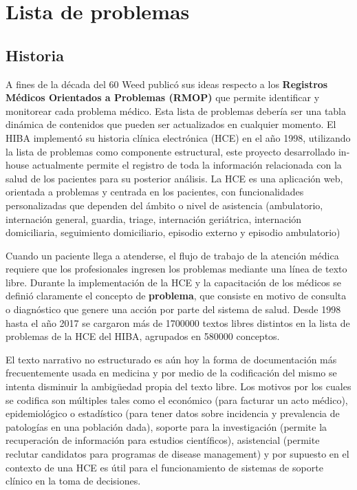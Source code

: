 \section{Lista de problemas}
\subsection{Historia}
A fines de la década del 60 Weed\cite{Weed1968} publicó sus ideas respecto a los \textbf{Registros Médicos Orientados a Problemas (RMOP)} que permite identificar y monitorear cada problema médico. Esta lista de problemas debería ser una tabla dinámica de contenidos que pueden ser actualizados en cualquier momento. El HIBA implementó su historia clínica electrónica (HCE) en el año 1998, utilizando la lista de problemas como componente estructural, este proyecto desarrollado in-house actualmente permite el registro de toda la información relacionada con la salud de los pacientes para su posterior análisis\cite{Luna2013,luna2003implementacion}. La HCE es una aplicación web, orientada a problemas y centrada en los pacientes, con funcionalidades personalizadas que dependen del ámbito o nivel de asistencia (ambulatorio, internación general, guardia, triage, internación geriátrica, internación domiciliaria, seguimiento domiciliario, episodio externo y episodio ambulatorio)
 
Cuando un paciente llega a atenderse, el flujo de trabajo de la atención médica requiere que los profesionales ingresen los problemas mediante una línea de texto libre. Durante la implementación de la HCE y la capacitación de los médicos se definió claramente el concepto de \textbf{problema}, que consiste en motivo de consulta o diagnóstico que
genere una acción por parte del sistema de salud\cite{lopez2004codificacion}. Desde 1998 hasta el año 2017 se cargaron más de \num{1700000} textos libres distintos en la lista de problemas de la HCE del HIBA, agrupados en \num{580000} conceptos.

El texto narrativo no estructurado es aún hoy la forma de documentación más frecuentemente usada en medicina y por medio de la codificación del mismo se intenta disminuir la ambigüedad propia del texto libre. Los motivos por los cuales se codifica son múltiples tales como el económico (para facturar un acto médico), epidemiológico o estadístico (para tener datos sobre incidencia y prevalencia de patologías en una población dada), soporte para la investigación (permite la recuperación de información para estudios científicos), asistencial (permite reclutar candidatos para programas de disease management) y por supuesto en el contexto de una HCE es útil para el funcionamiento de sistemas de soporte clínico en la toma de decisiones\cite{lopez2004codificacion,lopez2002creacion}. 

